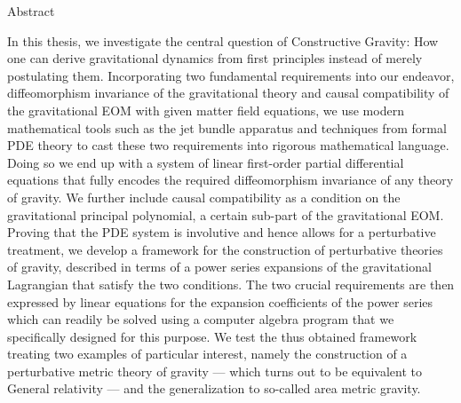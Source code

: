 \documentclass[a4paper,12pt, DIV=14, BCOR=5mm, twoside, headsepline, numbers=noenddot]{scrbook}
\newenvironment{abstract}{%
  \titlepage%
  \null\vfil%
  \begin{center}\normalfont\usekomafont{disposition}Abstract\end{center}%
}{%
  \par
  \vfil\null%
  \endtitlepage%
}
\begin{document}
\begin{abstract}
In this thesis, we investigate the central question of Constructive Gravity: 
How one can derive gravitational dynamics from first principles instead of merely postulating them. 
Incorporating two fundamental requirements into our endeavor, diffeomorphism invariance of the gravitational theory and causal compatibility of the gravitational EOM with given matter field equations, we use modern mathematical tools such as the jet bundle apparatus and techniques from formal PDE theory to cast these two requirements into rigorous mathematical language. Doing so we end up with a system of linear first-order partial differential equations that fully encodes the required diffeomorphism invariance of any theory of gravity. We further include causal compatibility as a condition on the gravitational principal polynomial, a certain sub-part of the gravitational EOM. 
Proving that the PDE system is involutive and hence allows for a perturbative treatment, we develop a framework for the construction of perturbative theories of gravity, described in terms of a power series expansions of the gravitational Lagrangian that satisfy the two conditions. The two crucial requirements are then expressed by linear equations for the expansion coefficients of the power series which can readily be solved using a computer algebra program that we specifically designed for this purpose. We test the thus obtained framework treating two examples of particular interest, namely the construction of a perturbative metric theory of gravity --- which turns out to be equivalent to General relativity --- and the generalization to so-called area metric gravity.
\end{abstract}
\end{document}
